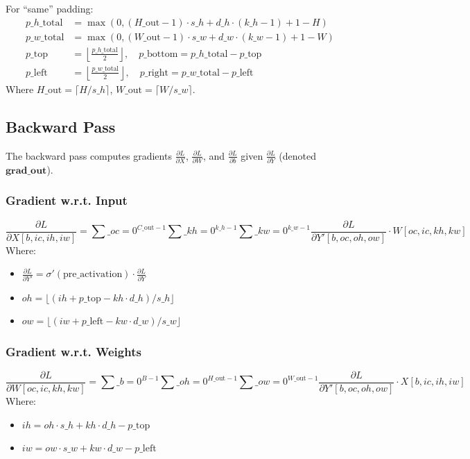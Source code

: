 \documentclass{article}
\begin{document}
For ``same'' padding:
\begin{align}
p\_{h\_{\text{total}}} &= \max(0, (H\_{\text{out}} - 1) \cdot s\_h + d\_h \cdot (k\_h - 1) + 1 - H) \\
p\_{w\_{\text{total}}} &= \max(0, (W\_{\text{out}} - 1) \cdot s\_w + d\_w \cdot (k\_w - 1) + 1 - W) \\
p\_{\text{top}} &= \left\lfloor \frac{p\_{h\_{\text{total}}}}{2} \right\rfloor, \quad p\_{\text{bottom}} = p\_{h\_{\text{total}}} - p\_{\text{top}} \\
p\_{\text{left}} &= \left\lfloor \frac{p\_{w\_{\text{total}}}}{2} \right\rfloor, \quad p\_{\text{right}} = p\_{w\_{\text{total}}} - p\_{\text{left}}
\end{align}
Where $H\_{\text{out}} = \lceil H / s\_h \rceil$, $W\_{\text{out}} = \lceil W / s\_w \rceil$.

\subsection{Backward Pass}
The backward pass computes gradients $\frac{\partial L}{\partial X}$, $\frac{\partial L}{\partial W}$, and $\frac{\partial L}{\partial b}$ given $\frac{\partial L}{\partial Y}$ (denoted $\textbf{grad\_out}$).

\subsubsection{Gradient w.r.t. Input}
\begin{equation}
\frac{\partial L}{\partial X[b, ic, ih, iw]} = \sum\_{oc=0}^{C\_{\text{out}}-1} \sum\_{kh=0}^{k\_h-1} \sum\_{kw=0}^{k\_w-1} \frac{\partial L}{\partial Y'[b, oc, oh, ow]} \cdot W[oc, ic, kh, kw]
\end{equation}
Where:
\begin{itemize}
    \item $\frac{\partial L}{\partial Y'} = \sigma'(\text{pre\_activation}) \cdot \frac{\partial L}{\partial Y}$
    \item $oh = \lfloor (ih + p\_{\text{top}} - kh \cdot d\_h) / s\_h \rfloor$
    \item $ow = \lfloor (iw + p\_{\text{left}} - kw \cdot d\_w) / s\_w \rfloor$
\end{itemize}

\subsubsection{Gradient w.r.t. Weights}
\begin{equation}
\frac{\partial L}{\partial W[oc, ic, kh, kw]} = \sum\_{b=0}^{B-1} \sum\_{oh=0}^{H\_{\text{out}}-1} \sum\_{ow=0}^{W\_{\text{out}}-1} \frac{\partial L}{\partial Y'[b, oc, oh, ow]} \cdot X[b, ic, ih, iw]
\end{equation}
Where:
\begin{itemize}
    \item $ih = oh \cdot s\_h + kh \cdot d\_h - p\_{\text{top}}$
    \item $iw = ow \cdot s\_w + kw \cdot d\_w - p\_{\text{left}}$
\end{itemize}
\end{document}
